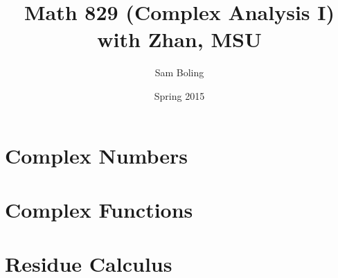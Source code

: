 \documentclass{report}
\title{Math 829 (Complex Analysis I) with Zhan, MSU}
\author{Sam Boling}
\date{Spring 2015}
\begin{document}
\maketitle

\chapter{Complex Numbers}



\chapter{Complex Functions}







\chapter{Residue Calculus}




\end{document}
